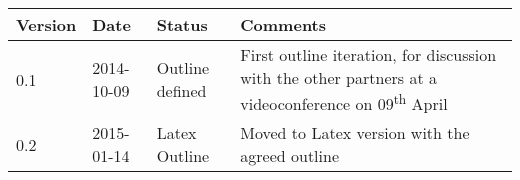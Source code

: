 \begin{table}[h]
  \begin{tabular}{|l|l|l|p{.5\linewidth}|}
  \hline
  \textbf{Version} & \textbf{Date} & \textbf{Status} & \textbf{Comments}\\
  \hline
  0.1 & 2014-10-09 & Outline defined & First outline iteration, for discussion with the other partners at a videoconference on 09\textsuperscript{th} April \\
   0.2 & 2015-01-14 & Latex Outline & Moved to Latex version with the agreed outline \\
  \hline
  \end{tabular}
\end{table}

